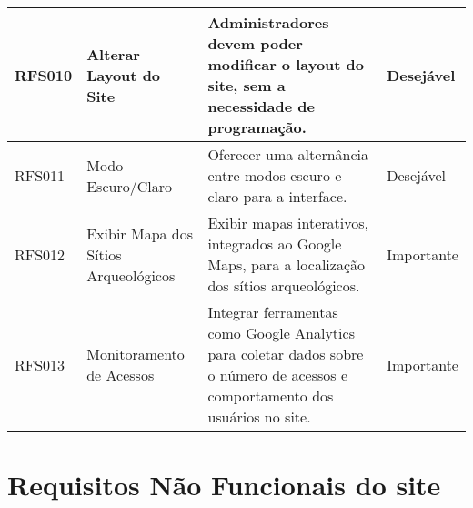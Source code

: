 {\begin{longtable}{|>{\raggedright}p{2.5cm}|>{\raggedright}p{4cm}|p{6cm}|>{\raggedright}p{2cm}|}
\hline
RFS010 & Alterar Layout do Site & Administradores devem poder modificar o layout do site, sem a necessidade de programação. & Desejável \\
\hline
RFS011 & Modo Escuro/Claro & Oferecer uma alternância entre modos escuro e claro para a interface. & Desejável \\
\hline
RFS012 & Exibir Mapa dos Sítios Arqueológicos & Exibir mapas interativos, integrados ao Google Maps, para a localização dos sítios arqueológicos. & Importante \\
\hline
RFS013 & Monitoramento de Acessos & Integrar ferramentas como Google Analytics para coletar dados sobre o número de acessos e comportamento dos usuários no site. & Importante \\
\hline
\end{longtable}
} %



\section{Requisitos Não Funcionais do site}

